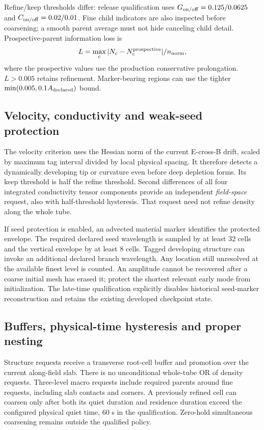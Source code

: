 Refine/keep thresholds differ: release qualification uses
$G_{\rm on/off}=0.125/0.0625$ and $C_{\rm on/off}=0.02/0.01$.
Fine child indicators are also inspected before coarsening; a smooth parent
average must not hide canceling child detail. Prospective-parent information
loss is
\begin{equation}
 L=\max_c|N_c-N_c^{\rm prospective}|/n_{\rm norm},
\end{equation}
where the prospective values use the production conservative prolongation.
$L>0.005$ retains refinement. Marker-bearing regions can use the tighter
$\min(0.005,0.1A_{\rm declared})$ bound.

\subsection{Velocity, conductivity and weak-seed protection}
The velocity criterion uses the Hessian norm of the current E-cross-B
drift, scaled by maximum tag interval divided by local physical spacing.
It therefore detects a dynamically developing tip or curvature even before
deep depletion forms. Its keep threshold is half the refine threshold.
Second differences of all four integrated conductivity tensor components
provide an independent \emph{field-space} request, also with half-threshold
hysteresis. That request need not refine density along the whole tube.

If seed protection is enabled, an advected material marker identifies
the protected envelope. The required declared seed wavelength is sampled
by at least 32 cells and the vertical envelope by at least 8 cells. Tagged
developing structure can invoke an additional declared branch wavelength.
Any location still unresolved at the available finest level is counted.
An amplitude cannot be recovered after a coarse initial mesh has erased it;
protect the shortest relevant early mode from initialization. The late-time
qualification explicitly disables historical seed-marker reconstruction
and retains the existing developed checkpoint state.

\subsection{Buffers, physical-time hysteresis and proper nesting}
Structure requests receive a transverse root-cell buffer and promotion over
the current along-field slab. There is no unconditional whole-tube OR of
density requests. Three-level macro requests include required parents around
fine requests, including slab contacts and corners. A previously refined
cell can coarsen only after both its quiet duration and residence duration
exceed the configured physical quiet time, 60 s in the qualification.
Zero-hold simultaneous coarsening remains outside the qualified policy.

